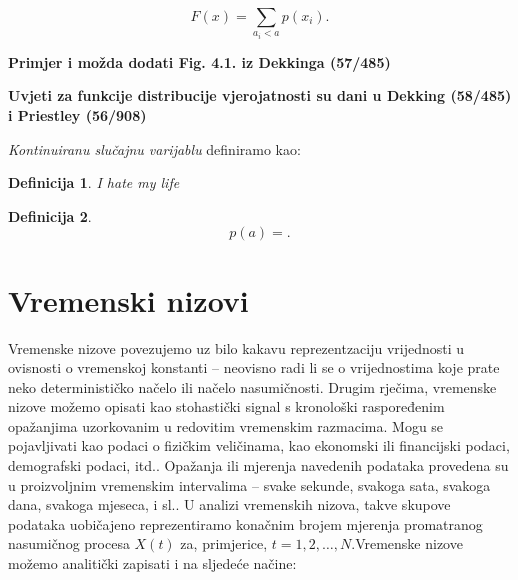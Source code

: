 \documentclass[a4paper,12pt,oneside]{memoir}
\newtheorem{definition}{Definicija}[chapter]
\begin{document}
                \begin{equation}
                    F(x)=\displaystyle\sum_{a_i<a}^{}p(x_i).
                \end{equation}

                \textbf{Primjer i možda dodati Fig. 4.1. iz Dekkinga (57/485)}

                \textbf{Uvjeti za funkcije distribucije vjerojatnosti su dani u Dekking (58/485) i Priestley (56/908)}





                \textit{Kontinuiranu slučajnu varijablu} definiramo kao:

                \begin{definition}
                    I hate my life
                \end{definition}

                \begin{definition}

                    \begin{equation*}
                        p(a)=.
                    \end{equation*}
                \end{definition}

        \section{Vremenski nizovi}

            Vremenske nizove povezujemo uz bilo kakavu reprezentzaciju vrijednosti u ovisnosti o vremenskoj konstanti -- neovisno radi li se o vrijednostima koje prate neko determinističko načelo ili načelo nasumičnosti. Drugim rječima, vremenske nizove možemo opisati kao stohastički signal s kronološki raspoređenim opažanjima uzorkovanim u redovitim vremenskim razmacima. Mogu se pojavljivati kao podaci o fizičkim veličinama, kao ekonomski ili financijski podaci, demografski podaci, itd.. Opažanja ili mjerenja navedenih podataka provedena su u proizvoljnim vremenskim intervalima -- svake sekunde, svakoga sata, svakoga dana, svakoga mjeseca, i sl.. U analizi vremenskih nizova, takve skupove podataka uobičajeno reprezentiramo konačnim brojem mjerenja promatranog nasumičnog procesa $X(t)$ za, primjerice, $t=1,2,\ldots,N$.\cite{Priestley}Vremenske nizove možemo analitički zapisati i na sljedeće načine:
\end{document}
